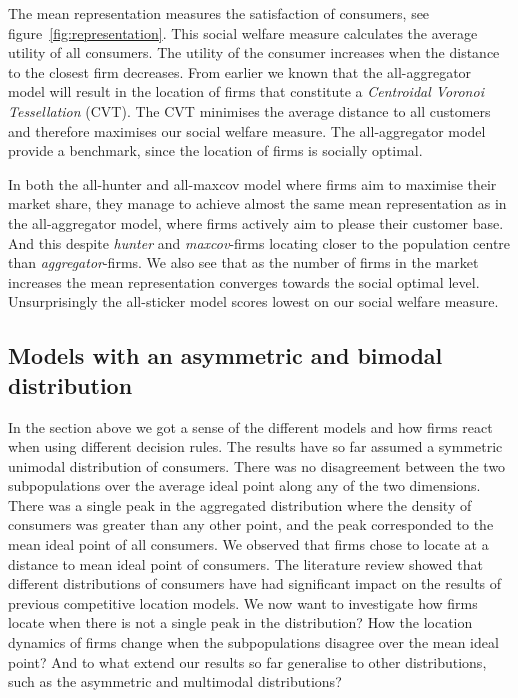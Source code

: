 \documentclass[preprint, 12pt]{elsarticle}
\begin{document}
The mean representation measures the satisfaction of consumers, see figure~\ref{fig:representation}. This social welfare measure calculates the average utility of all consumers. The utility of the consumer increases when the distance to the closest firm decreases. From earlier we known that the all-aggregator model will result in the location of firms that constitute a \emph{Centroidal Voronoi Tessellation} (CVT). The CVT minimises the average distance to all customers and therefore maximises our social welfare measure. The all-aggregator model provide a benchmark, since the location of firms is socially optimal.

In both the all-hunter and all-maxcov model where firms aim to maximise their market share, they manage to achieve almost the same mean representation as in the all-aggregator model, where firms actively aim to please their customer base. And this despite \emph{hunter} and \emph{maxcov}-firms locating closer to the population centre than \emph{aggregator}-firms. We also see that as the number of firms in the market increases the mean representation converges towards the social optimal level. Unsurprisingly the all-sticker model scores lowest on our social welfare measure.

\subsection{Models with an asymmetric and bimodal distribution}

In the section above we got a sense of the different models and how firms react when using different decision rules. The results have so far assumed a symmetric unimodal distribution of consumers. There was no disagreement between the two subpopulations over the average ideal point along any of the two dimensions. There was a single peak in the aggregated distribution where the density of consumers was greater than any other point, and the peak corresponded to the mean ideal point of all consumers. We observed that firms chose to locate at a distance to mean ideal point of consumers. The literature review showed that different distributions of consumers have had significant impact on the results of previous competitive location models. We now want to investigate how firms locate when there is not a single peak in the distribution? How the location dynamics of firms change when the subpopulations disagree over the mean ideal point? And to what extend our results so far generalise to other distributions, such as the asymmetric and multimodal distributions? 
\end{document}
